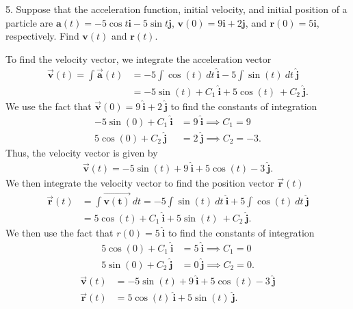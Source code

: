 \documentclass{report}
\begin{document}
    \bigbreak \noindent 
    \begin{mdframed}
        5. Suppose that the acceleration function, initial velocity, and initial position of a particle are $\mathbf{a}(t) = -5 \cos t \mathbf{i} - 5 \sin t \mathbf{j}$, $\mathbf{v}(0) = 9 \mathbf{i} + 2 \mathbf{j}$, and $\mathbf{r}(0) = 5\mathbf{i}$, respectively. Find $\mathbf{v}(t)$ and $\mathbf{r}(t)$.
    \end{mdframed}
    \bigbreak \noindent 
    To find the velocity vector, we integrate the acceleration vector
    \begin{align*}
        \vec{\mathbf{v}}(t) = \int \vec{\mathbf{a}}(t) &= -5\int \cos{\left(t\right)}\ dt\ \hat{\mathbf{i}} -5 \int \sin{\left(t\right)}\ dt \ \hat{\mathbf{j}} \\
                                 &= -5\sin{\left(t\right)} + C_{1}\ \hat{\mathbf{i}} + 5\cos{\left(t\right)}\ + C_{2}\ \hat{\mathbf{j}}
    .\end{align*}
    We use the fact that $\vec{\mathbf{v}}(0) = 9\ \hat{\mathbf{i}} + 2\ \hat{\mathbf{j}}$ to find the constants of integration
    \begin{align*}
        -5\sin{\left(0\right)} + C_{1}\ \hat{\mathbf{i}} &= 9\ \hat{\mathbf{i}} \implies C_{1} = 9 \\
        5\cos{\left(0\right)} + C_{2}\ \hat{\mathbf{j}} &=2\ \hat{\mathbf{j}} \implies C_{2} = -3
    .\end{align*}
    Thus, the velocity vector is given by 
    \begin{align*}
        \vec{\mathbf{v}}(t) = -5\sin{\left(t\right)} + 9\ \hat{\mathbf{i}} + 5\cos{\left(t\right)} -3\ \hat{\mathbf{j}}
    .\end{align*}
    We then integrate the velocity vector to find the position vector $\vec{\mathbf{r}}(t)$
    \begin{align*}
        \vec{\mathbf{r}}(t) &= \int \vec{\mathbf{v(t)}}\ dt = -5\int \sin{\left(t\right)}\ dt\ \hat{\mathbf{i}} + 5\int \cos{\left(t\right)}\ dt\ \hat{\mathbf{j}} \\
        &=5\cos{\left(t\right)} + C_{1}\ \hat{\mathbf{i}} + 5\sin{\left(t\right)}\ + C_{2}\ \hat{\mathbf{j}}
    .\end{align*}
    We then use the fact that $r(0) = 5\ \hat{\mathbf{i}}$ to find the constants of integration
    \begin{align*}
        5\cos{\left(0\right)} + C_{1}\ \hat{\mathbf{i}} &= 5\ \hat{\mathbf{i}} \implies C_{1} = 0 \\
        5\sin{\left(0\right)} + C_{2}\ \hat{\mathbf{j}} &= 0\ \hat{\mathbf{j}} \implies C_{2} = 0
    .\end{align*}
    \bigbreak \noindent 
    \begin{align*}
        \vec{\mathbf{v}}(t) &= -5\sin{\left(t\right)} + 9\ \hat{\mathbf{i}} + 5\cos{\left(t\right)} -3\ \hat{\mathbf{j}}\\
        \vec{\mathbf{r}}(t) &= 5\cos{\left(t\right)}\ \hat{\mathbf{i}} + 5\sin{\left(t\right)}\ \hat{\mathbf{j}}
    .\end{align*}
    



     
 
\end{document}

